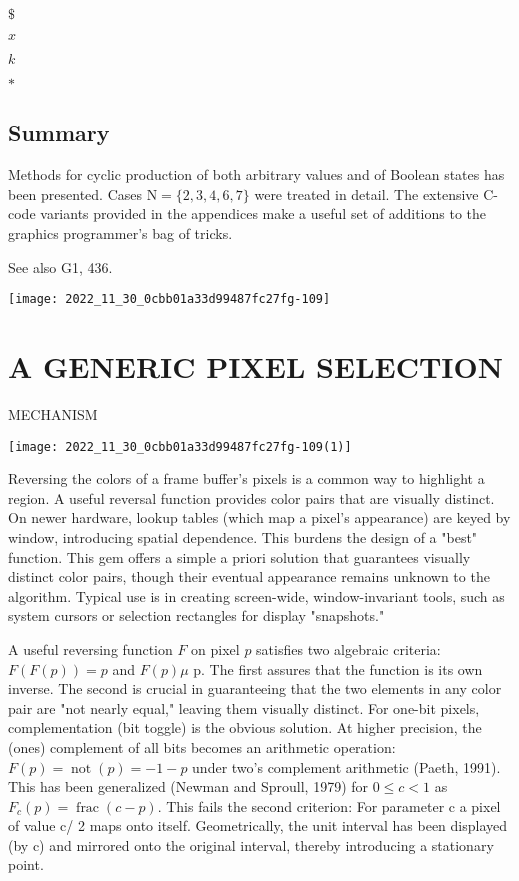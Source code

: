 \begin{CJK}{UTF8}{gbsn}
$\$$

$x$

$k$

$*$

\subsection*{Summary}
Methods for cyclic production of both arbitrary values and of Boolean states has been presented. Cases $\mathrm{N}=\{2,3,4,6,7\}$ were treated in detail. The extensive C-code variants provided in the appendices make a useful set of additions to the graphics programmer's bag of tricks.

See also G1, 436.

\begin{center}
\texttt{[image: 2022\_11\_30\_0cbb01a33d99487fc27fg-109]}
\end{center}

\section*{A GENERIC PIXEL SELECTION }
 MECHANISM\begin{center}
\texttt{[image: 2022\_11\_30\_0cbb01a33d99487fc27fg-109(1)]}
\end{center}

Reversing the colors of a frame buffer's pixels is a common way to highlight a region. A useful reversal function provides color pairs that are visually distinct. On newer hardware, lookup tables (which map a pixel's appearance) are keyed by window, introducing spatial dependence. This burdens the design of a "best" function. This gem offers a simple a priori solution that guarantees visually distinct color pairs, though their eventual appearance remains unknown to the algorithm. Typical use is in creating screen-wide, window-invariant tools, such as system cursors or selection rectangles for display "snapshots."

A useful reversing function $F$ on pixel $p$ satisfies two algebraic criteria: $F(F(p))=p$ and $F(p) \mu$ p. The first assures that the function is its own inverse. The second is crucial in guaranteeing that the two elements in any color pair are "not nearly equal," leaving them visually distinct. For one-bit pixels, complementation (bit toggle) is the obvious solution. At higher precision, the (ones) complement of all bits becomes an arithmetic operation: $F(p)=\operatorname{not}(p)=-1-p$ under two's complement arithmetic (Paeth, 1991). This has been generalized (Newman and Sproull, 1979) for $0 \leq c<1$ as $F_{c}(p)=\operatorname{frac}(c-p)$. This fails the second criterion: For parameter c a pixel of value c/ 2 maps onto itself. Geometrically, the unit interval has been displayed (by c) and mirrored onto the original interval, thereby introducing a stationary point.


\end{CJK}
